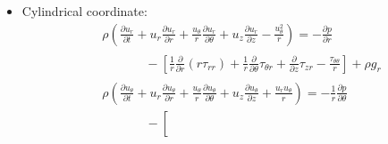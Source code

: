 \documentclass[../main.tex]{subfiles}
\begin{document}
\begin{itemize}
\begin{itemize}
      \begin{align}
        \rho\left(
          \frac{\partial u_x}{\partial t} + u_x\frac{\partial u_x}{\partial x} + u_y\frac{\partial u_x}{\partial y} + u_z\frac{\partial u_x}{\partial z}
        \right) &= - \frac{\partial p}{\partial x}-\left[
          \frac{\partial \tau_{xx}}{\partial x} + \frac{\partial \tau_{yx}}{\partial y} + \frac{\partial \tau_{zx}}{\partial z}
        \right] + \rho g_x \\
        \rho\left(
          \frac{\partial u_y}{\partial t} + u_x\frac{\partial u_y}{\partial x} + u_y\frac{\partial u_y}{\partial y} + u_z\frac{\partial u_y}{\partial z}
        \right) &= - \frac{\partial p}{\partial y}-\left[
          \frac{\partial \tau_{xy}}{\partial x} + \frac{\partial \tau_{yy}}{\partial y} + \frac{\partial \tau_{zy}}{\partial z}
        \right] + \rho g_y \\
        \rho\left(
          \frac{\partial u_z}{\partial t} + u_x\frac{\partial u_z}{\partial x} + u_y\frac{\partial u_z}{\partial y} + u_z\frac{\partial u_z}{\partial z}
        \right) &= - \frac{\partial p}{\partial z}-\left[
          \frac{\partial \tau_{xz}}{\partial x} + \frac{\partial \tau_{yz}}{\partial y} + \frac{\partial \tau_{zz}}{\partial z}
        \right] + \rho g_z
      \end{align}
    \item Cylindrical coordinate:
      \begin{align}
        &\rho\left(
          \frac{\partial u_r}{\partial t}  + u_r\frac{\partial u_r}{\partial r} + \frac{u_{\theta}}{r}\frac{\partial u_r}{\partial \theta} + u_z\frac{\partial u_r}{\partial z}
          - \frac{u_{\theta}^2}{r}
        \right) = - \frac{\partial p}{\partial r} \nonumber\\
        &\phantom{\rho\left(\frac{\partial u_r}{\partial t}\right)}-\left[
          \frac{1}{r}\frac{\partial}{\partial r}\left(r\tau_{rr}\right) + \frac{1}{r}\frac{\partial}{\partial \theta}\tau_{\theta r}
          + \frac{\partial}{\partial z}\tau_{zr} - \frac{\tau_{\theta\theta}}{r}
        \right] + \rho g_r \\
        &\rho\left(
          \frac{\partial u_{\theta}}{\partial t}  + u_r\frac{\partial u_{\theta}}{\partial r} 
          + \frac{u_{\theta}}{r}\frac{\partial u_{\theta}}{\partial \theta} + u_z\frac{\partial u_{\theta}}{\partial z}
          + \frac{u_r u_{\theta}}{r}
        \right) = - \frac{1}{r}\frac{\partial p}{\partial \theta} \nonumber\\
        &\phantom{\rho\left(\frac{\partial u_{\theta}}{\partial t}\right)}-\left[

\end{align}
\end{itemize}
\end{itemize}
\end{document}
